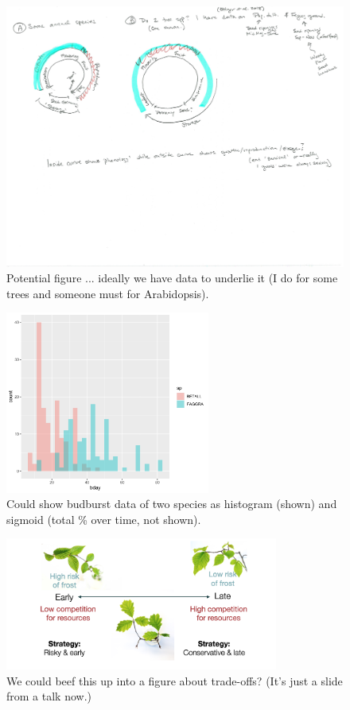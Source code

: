 \documentclass[11pt]{article}
\begin{document}
\begin{figure}[h!]
\centering
\includegraphics[width=1\textwidth]{..//figures/phenologycircles.pdf}
\caption{Potential figure ... ideally we have data to underlie it (I do for some trees and someone must for Arabidopsis).}
 \label{fig:phenologycircles}
\end{figure}

\clearpage

\begin{figure}[h!]
\centering
\includegraphics[width=0.6\textwidth]{..//figures/bbdata.pdf}
\caption{Could show budburst data of two species as histogram (shown) and sigmoid (total \% over time, not shown).}
 \label{fig:histsigmoid}
\end{figure}

\clearpage


\begin{figure}[h!]
\centering
\includegraphics[width=0.8\textwidth]{..//figures/wolkovich_CEFE2023wide_slide.png}
\caption{We could beef this up into a figure about trade-offs? (It's just a slide from a talk now.)}
 \label{fig:seasonaltradeoffs}
\end{figure}
\end{document}

